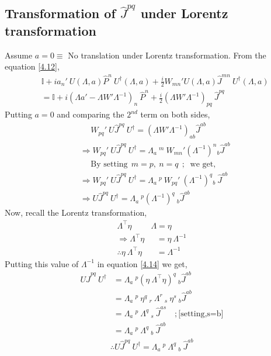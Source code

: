 \documentclass[14pt]{article} %
\begin{document}
\subsection*{Transformation of $\hat{J}^{pq}$ under Lorentz transformation}
Assume $a = 0 \equiv$ No translation under Lorentz transformation. From the equation \eqref{4.12},
\begin{align*}
&\mathbb{I} + i a_n' ~U(\Lambda, a) \hat{P}^n~ U^\dagger(\Lambda, a) + \frac{i}{2} W_{mn}' U(\Lambda, a) \hat{J}^{mn}~U^\dagger(\Lambda, a) \\
&= \mathbb{I} + i {(\Lambda a'-\Lambda W' \Lambda^{-1})}_n~\hat{P}^n + \frac{i}{2} {(\Lambda W' \Lambda^{-1})}_{pq}~\hat{J}^{pq}
\end{align*}
Putting $a=0$ and comparing the $2^{nd}$ term on both sides,
\begin{align*}
&~~~~~~ W_{pq}'~ U \hat{J}^{pq}~ U^\dagger = (\Lambda W' \Lambda^{-1})_{ab} \hat{J}^{ab} \\
&\Rightarrow W_{pq}'~ U \hat{J}^{pq}~ U^\dagger = \Lambda_a~^m~ W_{mn}'(\Lambda^{-1})^n{}_b \hat{J}^{ab} \\
&~~~~~~\text{By setting}~~ m=p,~n=q ~~;~\text{ we get,} \\
&\Rightarrow W_{pq}'~ U \hat{J}^{pq}~ U^\dagger = \Lambda_a~^p~ W_{pq}' ~(\Lambda^{-1})^q{}_b~ \hat{J}^{ab} \\
&\Rightarrow U \hat{J}^{pq}~ U^\dagger = \Lambda_a~^p (\Lambda^{-1})^q~_b \hat{J}^{ab} \tag{4.14} \label{4.14}
\end{align*}
Now, recall the Lorentz transformation,
\begin{align*}
\Lambda^\top \eta~&\Lambda = \eta \\
\Rightarrow \Lambda^\top \eta &~~~= \eta~\Lambda^{-1} \\
\therefore\eta ~\Lambda^\top \eta &~~~= \Lambda^{-1} \tag{4.15} \label{4.15}
\end{align*}
Putting this value of $\Lambda^{-1}$ in equation \eqref{4.14} we get,
\begin{align*}
U \hat{J}^{pq}~ U^\dagger &= \Lambda_a~^p (\eta ~\Lambda^\top \eta)^q~_b \hat{J}^{ab} \\
&= \Lambda_a~^p~\eta^q~_r~\Lambda^r~_s~\eta^s~_b \hat{J}^{ab}  \\
&= \Lambda_a~^p~\Lambda^q~_s~\hat{J}^{as} \quad ; \text{[setting,s=b]} \\
&= \Lambda_a~^p~\Lambda^q~_b~\hat{J}^{ab}
\end{align*}
\begin{align*}
\boxed{\therefore U \hat{J}^{pq}~ U^\dagger = \Lambda_a~^p~\Lambda^q~_b~\hat{J}^{ab}}
\end{align*}
\end{document}
